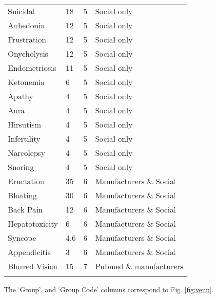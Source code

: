 \documentclass[referee,bst/sn-basic]{sn-jnl}%
\theoremstyle{thmstyletwo}%
\theoremstyle{thmstylethree}%
\begin{document}
\begin{appendices}
\begin{longtable}{llll}
Suicidal                                 & 18        & 5    & Social only             \\
Anhedonia                                & 12        & 5    & Social only             \\
Frustration                              & 12        & 5    & Social only             \\
Onycholysis                              & 12        & 5    & Social only             \\
Endometriosis                            & 11        & 5    & Social only             \\
Ketonemia                                & 6         & 5    & Social only             \\
Apathy                                   & 4         & 5    & Social only             \\
Aura                                     & 4         & 5    & Social only             \\
Hirsutism                                & 4         & 5    & Social only             \\
Infertility                              & 4         & 5    & Social only             \\
Narcolepsy                               & 4         & 5    & Social only             \\
Snoring                                  & 4         & 5    & Social only             \\
Eructation                               & 35        & 6    & Manufacturers \& Social \\
Bloating                                 & 30        & 6    & Manufacturers \& Social \\
Back Pain                                & 12        & 6    & Manufacturers \& Social \\
Hepatotoxicity                           & 6         & 6    & Manufacturers \& Social \\
Syncope                                  & 4.6       & 6    & Manufacturers \& Social \\
Appendicitis                             & 3         & 6    & Manufacturers \& Social \\
Blurred Vision                           & 15        & 7    & Pubmed \& manufacturers \\ \hline
\label{tbl:ases}
\end{longtable}
The `Group', and `Group Code' columns correspond to Fig. \ref{fig:venn}.


\end{appendices}
\end{document}
